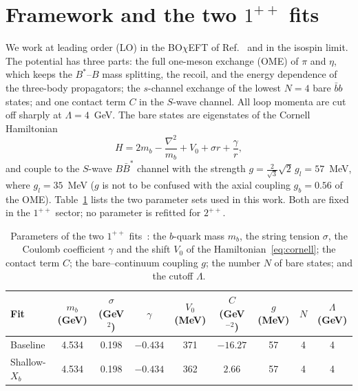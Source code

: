 \section{Framework and the two $1^{++}$ fits}
\label{sec:framework}

We work at leading order (LO) in the BO$\chi$EFT of
Ref.~\cite{Zhang:2026iyr} and in the isospin limit.
The potential has three parts: the full one-meson exchange (OME) of $\pi$
and $\eta$, which keeps the $B^*$--$B$ mass splitting, the recoil, and the
energy dependence of the three-body propagators; the $s$-channel exchange of
the lowest $N=4$ bare $\bar bb$ states; and one contact term $C$ in the
$S$-wave channel. All loop momenta are cut off sharply at $\Lambda=4$~GeV.
The bare states are eigenstates of the Cornell Hamiltonian
\begin{equation}
 H=2m_b-\frac{\nabla^2}{m_b}+V_0+\sigma r+\frac{\gamma}{r},
 \label{eq:cornell}
\end{equation}
and couple to the $S$-wave $B\bar B^*$ channel with the strength
$g=\frac{2}{\sqrt3}\sqrt2\,g_l=57$~MeV, where $g_l=35$~MeV
($g$ is not to be confused with the axial coupling $g_b=0.56$ of the OME).
Table~\ref{tab:onepp-inputs} lists the two parameter sets used in this work.
Both are fixed in the $1^{++}$ sector; no parameter is refitted for $2^{++}$.

\begin{table}[ht]
\centering
\caption{Parameters of the two $1^{++}$ fits~\cite{Zhang:2026iyr}: the
$b$-quark mass $m_b$, the string tension $\sigma$, the Coulomb coefficient
$\gamma$ and the shift $V_0$ of the Hamiltonian~\eqref{eq:cornell}; the
contact term $C$; the bare--continuum coupling $g$; the number $N$ of bare
states; and the cutoff $\Lambda$.}
\label{tab:onepp-inputs}
\begin{tabular}{lcccccccc}
\toprule
Fit & $m_b$ (GeV) & $\sigma$ (GeV$^2$) & $\gamma$ & $V_0$ (MeV) &
$C$ (GeV$^{-2}$) & $g$ (MeV) & $N$ & $\Lambda$ (GeV) \\
\midrule
Baseline & 4.534 & 0.198 & $-0.434$ & 371 & $-16.27$ & 57 & 4 & 4 \\
Shallow-$X_b$ & 4.534 & 0.198 & $-0.434$ & 362 & $2.66$ & 57 & 4 & 4 \\
\bottomrule
\end{tabular}
\end{table}

